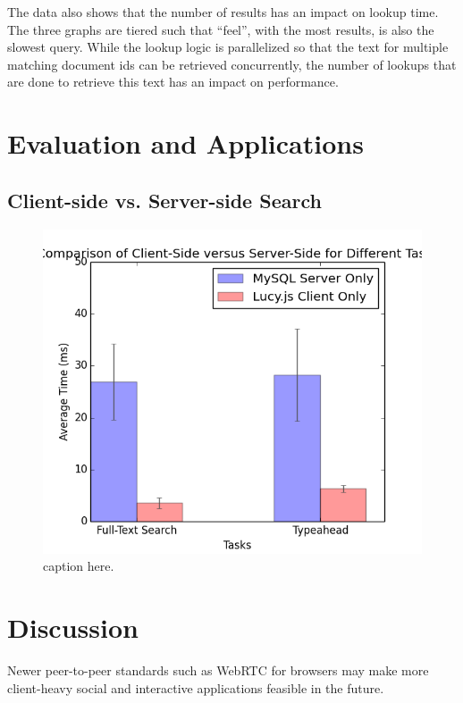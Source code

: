 \documentclass{vldb}
\begin{document}
The data also shows that the number of results has an  impact on lookup time. The three graphs are tiered such that ``feel'', with the most results, is also the slowest query. While the lookup logic is parallelized so that the text for multiple matching document ids can be retrieved concurrently, the number of lookups that are done to retrieve this text has an impact on performance.




\section{Evaluation and Applications}

\subsection{Client-side vs. Server-side Search}




\begin{figure}[h!]
   \includegraphics[scale=.53]{demo_results}
  \caption{caption here.}
\end{figure}



\section{Discussion}


Newer peer-to-peer standards such as WebRTC for browsers may make more client-heavy social and interactive applications feasible in the future.
\end{document}
